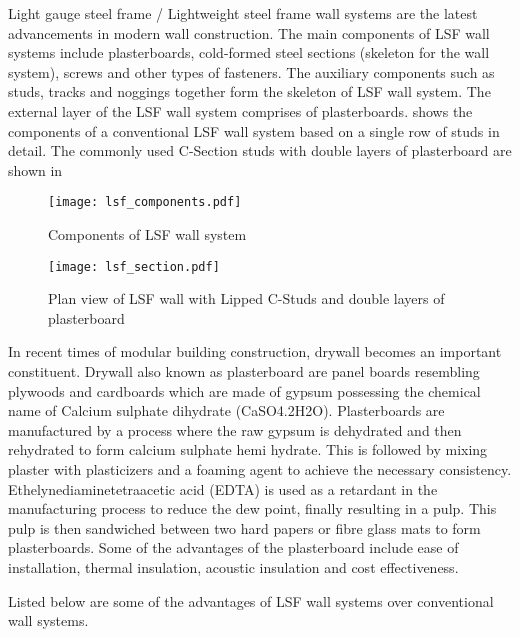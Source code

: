 Light gauge steel frame / Lightweight steel frame wall systems are the latest advancements in modern wall construction. The main components of LSF wall systems include plasterboards, cold-formed steel sections (skeleton for the wall system), screws and other types of fasteners. The auxiliary components such as studs, tracks and noggings together form the skeleton of LSF wall system. The external layer of the LSF wall system comprises of plasterboards.  shows the components of a conventional LSF wall system based on a single row of studs in detail. The commonly used C-Section studs with double layers of plasterboard are shown in 
\begin{figure}[htbp]
	\centering	
			\texttt{[image: lsf\_components.pdf]}
				\caption{Components of LSF wall system}
		\label{fig:lsf_components}
\end{figure}
\begin{figure}[htbp]
	\centering	
		\texttt{[image: lsf\_section.pdf]}
		\caption{Plan view of LSF wall with Lipped C-Studs and double layers of plasterboard}
		\label{fig:lsf_section}
\end{figure}

In recent times of modular building construction, drywall becomes an important constituent. Drywall also known as plasterboard are panel boards resembling plywoods and cardboards which are made of gypsum possessing the chemical name of Calcium sulphate dihydrate (CaSO4.2H2O). Plasterboards are manufactured by a process where the raw gypsum is dehydrated and then rehydrated to form calcium sulphate hemi hydrate. This is followed by mixing plaster with plasticizers and a foaming agent to achieve the necessary consistency. Ethelynediaminetetraacetic acid (EDTA) is used as a retardant in the manufacturing process to reduce the dew point, finally resulting in a pulp. This pulp is then sandwiched between two hard papers or fibre glass mats to form plasterboards. Some of the advantages of the plasterboard include ease of installation, thermal insulation, acoustic insulation and cost effectiveness.

Listed below are some of the advantages of LSF wall systems over conventional wall systems.

